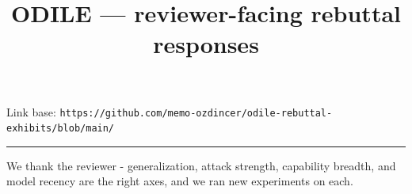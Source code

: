 \documentclass[11pt]{article}
\title{\vspace{-2em}\textbf{ODILE --- reviewer-facing rebuttal responses}}
\date{}
\begin{document}
\maketitle\vspace{-1em}



Link base: \texttt{https://github.com/memo-ozdincer/odile-rebuttal-exhibits/blob/main/}\par

\vspace{2pt}\hrule\vspace{4pt}

\vspace{4pt}\par

We thank the reviewer - generalization, attack strength, capability breadth, and model recency are the right axes, and we ran new experiments on each.\par
\end{document}
